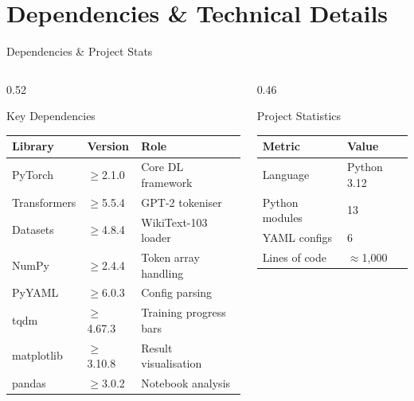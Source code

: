 \documentclass[aspectratio=169, 10pt]{beamer}
\begin{document}
\section{Dependencies \& Technical Details}

\begin{frame}{Dependencies \& Project Stats}
  \begin{columns}[T]
    \begin{column}{0.52\textwidth}
      \begin{block}{Key Dependencies}
        \begin{tabular}{llp{3.0cm}}
          \toprule
          \textbf{Library} & \textbf{Version} & \textbf{Role} \\
          \midrule
          PyTorch      & $\geq$2.1.0 & Core DL framework \\
          Transformers & $\geq$5.5.4 & GPT-2 tokeniser \\
          Datasets     & $\geq$4.8.4 & WikiText-103 loader \\
          NumPy        & $\geq$2.4.4 & Token array handling \\
          PyYAML       & $\geq$6.0.3 & Config parsing \\
          tqdm         & $\geq$4.67.3 & Training progress bars \\
          matplotlib   & $\geq$3.10.8 & Result visualisation \\
          pandas       & $\geq$3.0.2  & Notebook analysis \\
          \bottomrule
        \end{tabular}
      \end{block}
    \end{column}
    \begin{column}{0.46\textwidth}
      \begin{block}{Project Statistics}
        \begin{tabular}{ll}
          \toprule
          \textbf{Metric}       & \textbf{Value} \\
          \midrule
          Language         & Python 3.12 \\
          Python modules   & 13 \\
          YAML configs     & 6 \\
          Lines of code    & $\approx$1,000 \\

\end{tabular}
\end{block}
\end{column}
\end{columns}
\end{frame}
\end{document}
